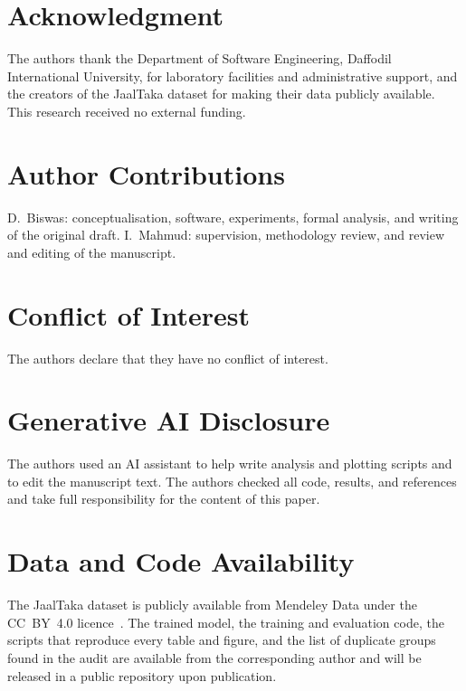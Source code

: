 \documentclass[journal]{IEEEtran}
\begin{document}
\section*{Acknowledgment}
The authors thank the Department of Software Engineering, Daffodil International
University, for laboratory facilities and administrative support, and the creators of
the JaalTaka dataset for making their data publicly available. This research received
no external funding.

\section*{Author Contributions}
D.~Biswas: conceptualisation, software, experiments, formal analysis, and writing of the
original draft. I.~Mahmud: supervision, methodology review, and review and editing of
the manuscript.

\section*{Conflict of Interest}
The authors declare that they have no conflict of interest.

\section*{Generative AI Disclosure}
The authors used an AI assistant to help write analysis and plotting scripts and to
edit the manuscript text. The authors checked all code, results, and references and take
full responsibility for the content of this paper.

\section*{Data and Code Availability}
The JaalTaka dataset is publicly available from Mendeley Data under the CC~BY~4.0
licence~\cite{jaaltaka_data}. The trained model, the training and evaluation code, the
scripts that reproduce every table and figure, and the list of duplicate groups found in
the audit are available from the corresponding author and will be released in a public
repository upon publication.



\end{document}
